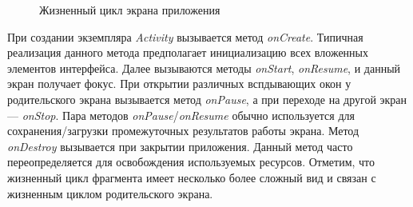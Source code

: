 \begin{figure}[h!]
  \centering
  \caption{Жизненный цикл экрана приложения}
  \label{fig:implementation_ui_lifecycle_activity}
\end{figure}

При создании экземпляра \textit{Activity} вызывается метод \textit{onCreate}.
Типичная реализация данного метода предполагает инициализацию
всех вложенных элементов интерфейса.
Далее вызываются методы \textit{onStart}, \textit{onResume},
и данный экран получает фокус.
При открытии различных вспдывающих окон у родительского экрана вызывается
метод \textit{onPause}, а при переходе на другой экран --- \textit{onStop}.
Пара методов \textit{onPause}/\textit{onResume} обычно используется для
сохранения/загрузки промежуточных результатов работы экрана.
Метод \textit{onDestroy} вызывается при закрытии приложения.
Данный метод часто переопределяется для освобождения используемых ресурсов.
Отметим, что жизненный цикл фрагмента имеет несколько более сложный вид
и связан с жизненным циклом родительского экрана.

